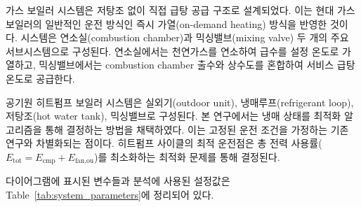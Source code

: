 \documentclass[final,5p,times,twocolumn,authoryear]{elsarticle}
\begin{document}
가스 보일러 시스템은 저탕조 없이 직접 급탕 공급 구조로 설계되었다. 이는 현대 가스 보일러의 일반적인 운전 방식인 즉시 가열(on-demand heating) 방식을 반영한 것이다. 시스템은 연소실(combustion chamber)과 믹싱밸브(mixing valve) 두 개의 주요 서브시스템으로 구성된다. 연소실에서는 천연가스를 연소하여 급수를 설정 온도로 가열하고, 믹싱밸브에서는 combustion chamber 출수와 상수도를 혼합하여 서비스 급탕 온도로 공급한다.

공기원 히트펌프 보일러 시스템은 실외기(outdoor unit), 냉매루프(refrigerant loop), 저탕조(hot water tank), 믹싱밸브로 구성된다. 본 연구에서는 냉매 상태를 최적화 알고리즘을 통해 결정하는 방법을 채택하였다. 이는 고정된 운전 조건을 가정하는 기존 연구와 차별화되는 점이다. 히트펌프 사이클의 최적 운전점은 총 전력 사용률($E_{\text{tot}} = E_{\text{cmp}} + E_{\text{fan,ou}}$)를 최소화하는 최적화 문제를 통해 결정된다.

다이어그램에 표시된 변수들과 분석에 사용된 설정값은 Table~\ref{tab:system_parameters}에 정리되어 있다.
\end{document}
